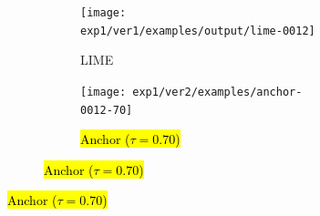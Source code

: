 \documentclass[runningheads]{llncs}
\begin{document}
{  {%
    \def\scale{0.315}
    \def\dir{exp1/ver1/examples/output}
    \def\imgwidth{0.3\textwidth}
    \def\hspacebase{\hspace{-1.5em}}
    \def\vspacebase{\vspace{0.5em}}
    \def\vspacebeforecaption{\vspace{-0.4em}}
    \begin{figure}[t]
      \begin{subfigure}[t]{0.45\textwidth}
        \centering
        \begin{subfigure}[t]{\textwidth}
          \hspace{-10pt}
          \texttt{[image: exp1/ver1/examples/output/lime-0012]}
          \caption{LIME}\label{fig:lime-0}
          \vspace{1.0em}
        \end{subfigure}

        \vspace{10pt}
        \begin{subfigure}[t]{\textwidth}
          \centering
          \texttt{[image: exp1/ver2/examples/anchor-0012-70]}  %
          \caption{\hl{Anchor ($\tau=0.70$)}}\label{fig:anchor-0-70}
          \vspace{1.0em}
        \end{subfigure}


\end{subfigure}
\end{figure}}}
\end{document}
